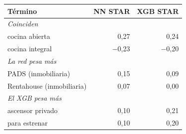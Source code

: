 \begin{tabular}{l r r}
\toprule
Término & NN STAR & XGB STAR \\
\midrule
\multicolumn{3}{l}{\textit{Coinciden}} \\
cocina abierta & 0,27 & 0,24 \\
cocina integral & $-$0,23 & $-$0,20 \\
\multicolumn{3}{l}{\textit{La red pesa más}} \\
PADS (inmobiliaria) & 0,15 & 0,09 \\
Rentahouse (inmobiliaria) & 0,07 & 0,00 \\
\multicolumn{3}{l}{\textit{El XGB pesa más}} \\
ascensor privado & 0,10 & 0,21 \\
para estrenar & 0,10 & 0,20 \\
\bottomrule
\end{tabular}
